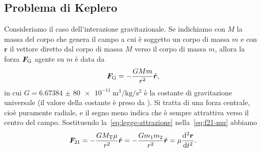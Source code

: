 \subsection{Problema di Keplero}
\label{sec:problema-keplero}

Consideriamo il caso dell'interazione gravitazionale. Se indichiamo con $M$ la
massa del corpo che genera il campo a cui è soggetto un corpo di massa $m$ e con
$\bm{r}$ il vettore diretto dal corpo di massa $M$ verso il corpo di massa $m$,
allora la forza $\bm{F}_\textup{G}$ agente su $m$ è data da
\begin{equation}
  \label{eq:legge-attrazione}
  \bm{F}_\textup{G} = -\frac{GMm}{r^2}\versor{r},
\end{equation}
in cui $G=\SI{6.673 84(80)e-11}{\cubic\metre\per\kilogram\per\second\squared}$ è
la costante di gravitazione universale (il valore della costante è preso da
\textcite{codata:costanti}). Si tratta di una forza centrale, cioè puramente
radiale, e il segno meno indica che è sempre attrattiva verso il centro del
campo. Sostituendo la~\eqref{eq:legge-attrazione} nella~\eqref{eq:f21-mu}
abbiamo
\begin{equation}
  \label{eq:forza-mu}
  \bm{F}_{21} = -\frac{GM_\textup{T}\mu}{r^2}\versor{r} =
  -\frac{Gm_1m_2}{r^2}\versor{r} = \mu\toder[2]{\bm{r}}{t}.
\end{equation}

